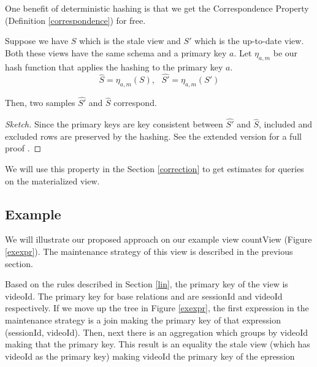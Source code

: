 One benefit of deterministic hashing is that we get the Correspondence Property (Definition \ref{correspondence}) for free.
\begin{proposition}
Suppose we have $S$ which is the stale view and $S'$ which is the up-to-date view.
Both these views have the same schema and a primary key $a$.
Let $\eta_{a, m}$ be our hash function that applies the hashing to the primary key $a$.
\[
\hat{S} = \eta_{a, m}(S),\text{ } \hat{S'} = \eta_{a, m}(S')
\]

Then, two samples $\hat{S'}$ and $\hat{S}$ correspond.
\end{proposition}
\begin{proof}[Sketch]
Since the primary keys are key consistent between $\hat{S'}$ and $\hat{S}$, included and excluded rows are preserved by the hashing.
See the extended version for a full proof \cite{technicalReport}.

\end{proof}
We will use this property in the Section \ref{correction} to get estimates for queries on the materialized view.

\subsection{Example}
We will illustrate our proposed approach on our example view \textsf{countView} (Figure \ref{exexpr}).
The maintenance strategy of this view is described in the previous section.

Based on the rules described in Section \ref{lin}, the primary key of the view is \textsf{videoId}.
The primary key for base relations  and  are \textsf{sessionId} and \textsf{videoId} respectively.
If we move up the tree in Figure \ref{exexpr}, the first expression in the maintenance strategy is a join making the primary key of that expression (\textsf{sessionId}, \textsf{videoId}).
Then, next there is an aggregation which groups by \textsf{videoId} making that the primary key.
This result is an equality the stale view (which has \textsf{videoId} as the primary key) making \textsf{videoId} the primary key of the epression

